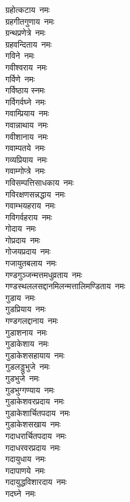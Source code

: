 \begin{multicols}{2}
\begin{flushleft}
ग्रहोत्कटाय~नमः\\
ग्रहगीतगुणाय~नमः\\
ग्रन्थप्रणेत्रे~नमः\\
ग्रहवन्दिताय~नमः\\
गविने~नमः\\
गवीश्वराय~नमः\\
गर्विणे~नमः\hfill{}\\
गर्विष्ठाय स्नमः\\
गर्विगर्वघ्ने~नमः\\
गवाम्प्रियाय~नमः\\
गवान्नाथाय~नमः\\
गवीशानाय~नमः\\
 गवाम्पतये~नमः\\
गव्यप्रियाय~नमः\\
गवाम्गोप्त्रे~नमः\\
गविसम्पत्तिसाधकाय~नमः\\
गविरक्षणसन्नद्धाय~नमः\hfill{}\\
गवाम्भयहराय~नमः\\
गविगर्वहराय~नमः\\
गोदाय~नमः\\
गोप्रदाय~नमः\\
गोजयप्रदाय~नमः\\
गजायुतबलाय~नमः\\
गण्डगुञ्जन्मत्तमधुव्रताय~नमः\\
गण्डस्थललसद्दान\-मिलन्मत्तालि\-मण्डिताय~नमः\\
गुडाय~नमः\\
गुडप्रियाय~नमः\hfill{}\\
गण्डगलद्दानाय~नमः\\
गुडाशनाय~नमः\\
गुडाकेशाय~नमः\\
गुडाकेशसहायाय~नमः\\
गुडलड्डुभुजे~नमः\\
गुडभुजे~नमः\\
गुडभुग्गण्याय~नमः\\
गुडाकेशवरप्रदाय~नमः\\
गुडाकेशार्चितपदाय~नमः\\
गुडाकेशसखाय~नमः\hfill{}\\
गदाधरार्चितपदाय~नमः\\
गदाधरवरप्रदाय~नमः\\
गदायुधाय~नमः\\
गदापाणये~नमः\\
गदायुद्धविशारदाय~नमः\\
गदघ्ने~नमः\\

\end{flushleft}
\end{multicols}
